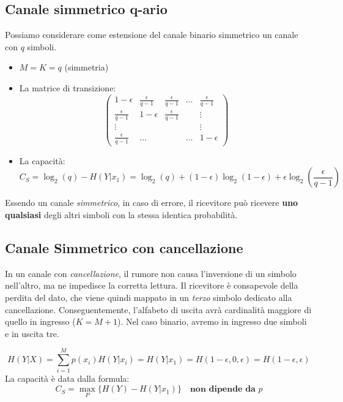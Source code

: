 \subsection{Canale simmetrico q-ario}
Possiamo considerare come estensione del canale binario simmetrico un canale con $q$ simboli.
\begin{itemize}
    \item $M = K = q$ (simmetria)
    \item La matrice di transizione:
        \[
\renewcommand{\arraystretch}{2} %
\begin{pmatrix} 
    1 - \epsilon & \frac{\epsilon}{q-1} & \frac{\epsilon}{q-1} & \dots & \frac{\epsilon}{q-1} \\ 
    \frac{\epsilon}{q-1} & 1 - \epsilon & \frac{\epsilon}{q-1} & & \vdots \\ 
    \vdots & & & & \vdots \\ 
    \frac{\epsilon}{q-1} & \dots & & \dots & 1 - \epsilon 
\end{pmatrix}
\]
\item La capacità:
\[C_S = \log_2(q) - H(Y|x_1) = \log_2(q) + (1-\epsilon)\log_2(1-\epsilon) + \epsilon \log_2\left(\frac{\epsilon}{q-1}\right)\]
\end{itemize}
%
Essendo un canale \textit{simmetrico}, in caso di errore, il ricevitore può ricevere \textbf{uno qualsiasi} degli altri simboli con la stessa identica probabilità.

\subsection{Canale Simmetrico con cancellazione}
In un canale con \textit{cancellazione}, il rumore non causa l'inversione di un simbolo nell'altro, ma ne impedisce la corretta lettura. Il ricevitore è consapevole della perdita del dato, che viene quindi mappato in un \textit{terzo} simbolo dedicato alla cancellazione.
Conseguentemente, l'alfabeto di uscita avrà cardinalità maggiore di quello in ingresso ($K=M+1$). Nel caso binario, avremo in ingresso due simboli e in uscita tre.

%


\[H(Y|X) = \sum_{i=1}^M p(x_i)H(Y|x_i)= H(Y|x_1)= H(1-\epsilon,0,\epsilon) = H(1-\epsilon, \epsilon)\]
La capacità è data dalla formula:
\[C_S = \max_{P}\{H(Y)-H(Y|x_1)\} \quad \textbf{non dipende da $p$}\]

